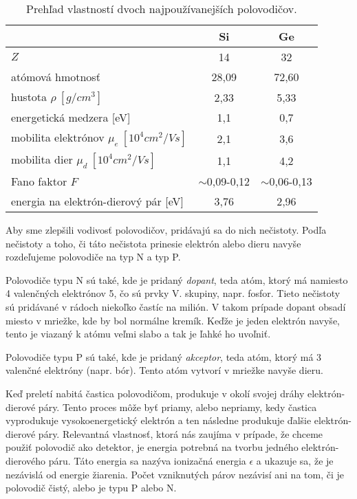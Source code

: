 \documentclass[../../main.tex]{subfiles}
\begin{document}
\begin{table}[h]
\centering
\caption{Prehľad vlastností dvoch najpoužívanejších polovodičov.}
\begin{tabular}{|l c c|}
\hline
& Si & Ge \\ \hline
$Z$ & 14 & 32 \\
atómová hmotnosť & 28,09 & 72,60 \\
hustota $\rho\:[\unit{g/cm^3}]$ & 2,33 & 5,33 \\
energetická medzera [eV] & 1,1 & 0,7 \\
mobilita elektrónov $\mu_e\:[\unit{10^4cm^2/Vs}]$ & 2,1 & 3,6 \\
mobilita dier $\mu_d\:[\unit{10^4cm^2/Vs}]$ & 1,1 & 4,2 \\
Fano faktor $F$ & $\sim$0,09-0,12 & $\sim$0,06-0,13 \\
energia na elektrón-dierový pár [eV] & 3,76 & 2,96 \\ \hline
\end{tabular}
\label{js1:tab:polovodice}
\end{table}

Aby sme zlepšili vodivosť polovodičov, pridávajú sa do nich nečistoty. Podľa nečistoty a toho, či táto nečistota prinesie elektrón alebo dieru navyše rozdeľujeme polovodiče na typ N a typ P.

Polovodiče typu N sú také, kde je pridaný \textit{dopant}, teda atóm, ktorý má namiesto 4 valenčných elektrónov 5, čo sú prvky V. skupiny, napr. fosfor. Tieto nečistoty sú pridávané v rádoch niekoľko častíc na milión. V takom prípade dopant obsadí miesto v mriežke, kde by bol normálne kremík. Keďže je jeden elektrón navyše, tento je viazaný k atómu veľmi slabo a tak je ľahké ho uvoľniť.

Polovodiče typu P sú také, kde je pridaný \textit{akceptor}, teda atóm, ktorý má 3 valenčné elektróny (napr. bór). Tento atóm vytvorí v mriežke navyše dieru. 

Keď preletí nabitá častica polovodičom, produkuje v okolí svojej dráhy elektrón-dierové páry. Tento proces môže byť priamy, alebo nepriamy, kedy častica vyprodukuje vysokoenergetický elektrón a ten následne produkuje ďalšie elektrón-dierové páry. Relevantná vlastnosť, ktorá nás zaujíma v prípade, že chceme použiť polovodič ako detektor, je energia potrebná na tvorbu jedného elektrón-dierového páru. Táto energia sa nazýva ionizačná energia $\epsilon$ a ukazuje sa, že je nezávislá od energie žiarenia. Počet vzniknutých párov nezávisí ani na tom, či je polovodič čistý, alebo je typu P alebo N.
\end{document}
